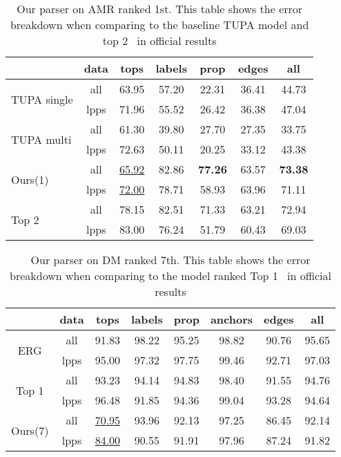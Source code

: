 \begin{table}[!ht]
\caption{\label{tbl:results_amr} Our parser on AMR ranked 1st. This table shows the error breakdown when comparing to the baseline TUPA model and top 2~\cite{Che:Dou:Xu:19} in official results}
\small
\centering
\setlength{\tabcolsep}{3pt}
\begin{tabular}{lcccccc}
\toprule
                          & data & tops              & labels & prop  & edges & all   \\ \hline
\multirow{2}{*}{ \parbox{1cm}{TUPA
single} }                 & all  & 63.95             & 57.20  & 22.31 & 36.41 & 44.73 \\
                          & lpps & 71.96             & 55.52  & 26.42 & 36.38 & 47.04 \\ \hline
\multirow{2}{*}{ \parbox{1cm}{TUPA
multi} }                  & all  & 61.30             & 39.80  & 27.70 & 27.35 & 33.75 \\
                          & lpps & 72.63             & 50.11  & 20.25 & 33.12 & 43.38 \\ \hline
\multirow{2}{*}{ Ours(1)} & all  & \underline{65.92} & 82.86  & {\bf 77.26} & 63.57 & {\bf 73.38} \\
                          & lpps & \underline{72.00} & 78.71  & 58.93 & 63.96 & 71.11 \\ \hline
\multirow{2}{*}{ Top 2}  & all  & 78.15             & 82.51  & 71.33 & 63.21 & 72.94 \\
                          & lpps & 83.00             & 76.24  & 51.79 & 60.43 & 69.03 \\ \bottomrule
\end{tabular}
\end{table}

\begin{table}[!h]
\caption{\label{tbl:results_dm} Our parser on DM ranked 7th. This table shows the error breakdown when comparing to the model ranked Top 1~\citep{Li:Zha:Zha:19} in official results}
\small
\centering
\setlength{\tabcolsep}{2.5pt}
\begin{tabular}{cccccccc}
  \toprule
                            & data & tops              & labels & prop  & anchors & edges & all   \\ \hline
  \multirow{2}{*}{ ERG }    & all  & 91.83             & 98.22  & 95.25 & 98.82   & 90.76 & 95.65 \\
                            & lpps & 95.00             & 97.32  & 97.75 & 99.46   & 92.71 & 97.03 \\
  \multirow{2}{*}{Top 1}    & all  & 93.23             & 94.14  & 94.83 & 98.40   & 91.55 & 94.76 \\
                            & lpps & 96.48             & 91.85  & 94.36 & 99.04   & 93.28 & 94.64 \\
  \multirow{2}{*}{ Ours(7)} & all  & \underline{70.95} & 93.96  & 92.13 & 97.25   & 86.45 & 92.14 \\
                            & lpps & \underline{84.00} & 90.55  & 91.91 & 97.96   & 87.24 & 91.82 \\ \bottomrule
\end{tabular}
\end{table}



